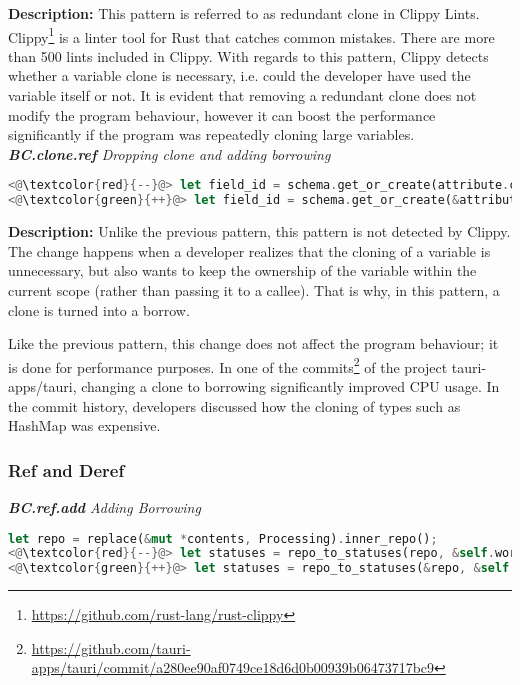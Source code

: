 \noindent\textbf{Description:} This pattern is referred to as redundant clone in Clippy Lints. Clippy\footnote{\url{https://github.com/rust-lang/rust-clippy}} is a linter tool for Rust that catches common mistakes. There are more than 500 lints included in Clippy. With regards to this pattern, Clippy detects whether a variable clone is necessary, i.e. could the developer have used the variable itself or not. It is evident that removing a redundant clone does not modify the program behaviour, however it can boost the performance significantly if the program was repeatedly cloning large variables. \\

\noindent\textit{\textbf{BC.clone.ref} Dropping clone and adding borrowing}

\begin{lstlisting}[language=Rust, style=colouredRust]
<@\textcolor{red}{--}@> let field_id = schema.get_or_create(attribute.clone())?;
<@\textcolor{green}{++}@> let field_id = schema.get_or_create(&attribute)?;
\end{lstlisting}

\noindent\textbf{Description:} Unlike the previous pattern, this pattern is not detected by Clippy. The change happens when a developer realizes that the cloning of a variable is unnecessary, but also wants to keep the ownership of the variable within the current scope (rather than passing it to a callee). That is why, in this pattern, a clone is turned into a borrow. 

Like the previous pattern, this change does not affect the program behaviour; it is done for performance purposes. In one of the commits\footnote{\scriptsize \url{https://github.com/tauri-apps/tauri/commit/a280ee90af0749ce18d6d0b00939b06473717bc9}} of the project tauri-apps/tauri, changing a clone to borrowing significantly improved CPU usage. In the commit history, developers discussed how the cloning of types such as HashMap was expensive. \\

\subsubsection{Ref and Deref}

\noindent\textit{\textbf{BC.ref.add} Adding Borrowing}

\begin{lstlisting}[language=Rust, style=colouredRust]
let repo = replace(&mut *contents, Processing).inner_repo();
<@\textcolor{red}{--}@> let statuses = repo_to_statuses(repo, &self.workdir);
<@\textcolor{green}{++}@> let statuses = repo_to_statuses(&repo, &self.workdir);
\end{lstlisting}

